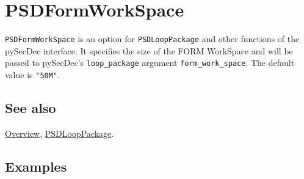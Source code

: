 \documentclass[../FeynHelpersManual.tex]{subfiles}
\begin{document}
\hypertarget{psdformworkspace}{
\section{PSDFormWorkSpace}\label{psdformworkspace}}

\texttt{PSDFormWorkSpace} is an option for \texttt{PSDLoopPackage} and
other functions of the pySecDec interface. It specifies the size of the
FORM WorkSpace and will be passed to pySecDec's \texttt{loop_package}
argument \texttt{form_work_space}. The default value is \texttt{"50M"}.

\subsection{See also}

\hyperlink{toc}{Overview}, \hyperlink{psdlooppackage}{PSDLoopPackage}.

\subsection{Examples}
\end{document}
